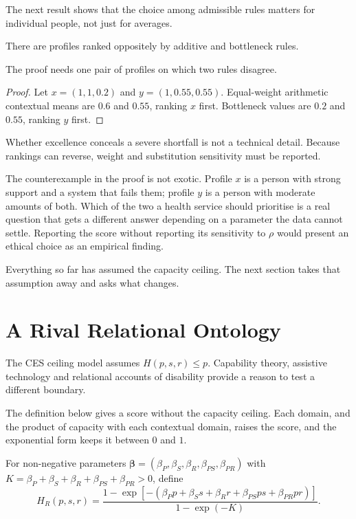 The next result shows that the choice among admissible rules matters for
individual people, not just for averages.

\begin{proposition}
There are profiles ranked oppositely by additive and bottleneck rules.
\end{proposition}
The proof needs one pair of profiles on which two rules disagree.
\begin{proof}
Let $x=(1,1,0.2)$ and $y=(1,0.55,0.55)$. Equal-weight arithmetic contextual
means are $0.6$ and $0.55$, ranking $x$ first. Bottleneck values are $0.2$ and
$0.55$, ranking $y$ first.
\end{proof}

\begin{remark}
Whether excellence conceals a severe shortfall is not a technical detail.
Because rankings can reverse, weight and substitution sensitivity must be
reported.
\end{remark}

The counterexample in the proof is not exotic. Profile $x$ is a person with
strong support and a system that fails them; profile $y$ is a person with
moderate amounts of both. Which of the two a health service should prioritise
is a real question that gets a different answer depending on a parameter the
data cannot settle. Reporting the score without reporting its sensitivity to
$\rho$ would present an ethical choice as an empirical finding.

Everything so far has assumed the capacity ceiling. The next section takes that
assumption away and asks what changes.

\section{A Rival Relational Ontology}
\label{app:a-relational}

The CES ceiling model assumes $H(p,s,r)\le p$. Capability theory, assistive
technology and relational accounts of disability provide a reason to test a
different boundary.

The definition below gives a score without the capacity ceiling. Each domain,
and the product of capacity with each contextual domain, raises the score, and
the exponential form keeps it between $0$ and $1$.

\begin{definition}
For non-negative parameters
$\boldsymbol\beta=(\beta_P,\beta_S,\beta_R,\beta_{PS},\beta_{PR})$ with
$K=\beta_P+\beta_S+\beta_R+\beta_{PS}+\beta_{PR}>0$, define
\[
H_R(p,s,r)=
\frac{1-\exp[-(\beta_Pp+\beta_Ss+\beta_Rr+
\beta_{PS}ps+\beta_{PR}pr)]}{1-\exp(-K)}.
\]
\end{definition}

